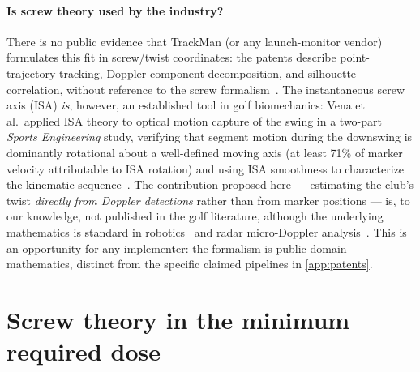 \paragraph{Is screw theory used by the industry?}
There is no public evidence that TrackMan (or any launch-monitor vendor) formulates this fit in screw/twist coordinates: the patents describe point-trajectory tracking, Doppler-component decomposition, and silhouette correlation, without reference to the screw formalism~\cite{us8845442,us10850179}.
The instantaneous screw axis (ISA) \emph{is}, however, an established tool in golf biomechanics: Vena et al.\ applied ISA theory to optical motion capture of the swing in a two-part \emph{Sports Engineering} study, verifying that segment motion during the downswing is dominantly rotational about a well-defined moving axis (at least 71\% of marker velocity attributable to ISA rotation) and using ISA smoothness to characterize the kinematic sequence~\cite{vena2010a,vena2010b}.
The contribution proposed here --- estimating the club's twist \emph{directly from Doppler detections} rather than from marker positions --- is, to our knowledge, not published in the golf literature, although the underlying mathematics is standard in robotics~\cite{murrayliss} and radar micro-Doppler analysis~\cite{chenmicrodoppler}.
This is an opportunity for any implementer: the formalism is public-domain mathematics, distinct from the specific claimed pipelines in \cref{app:patents}.

\section{Screw theory in the minimum required dose}
\label{sec:screw-primer}

